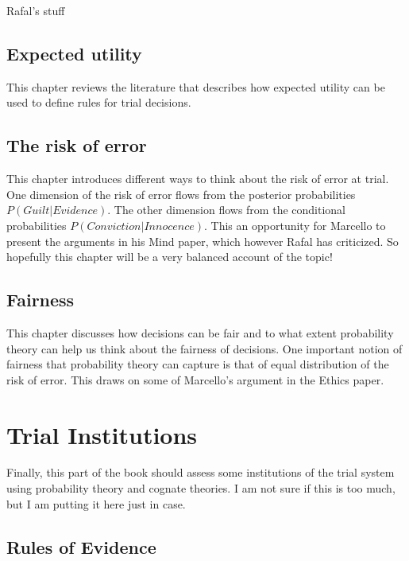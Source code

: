 \documentclass[]{book}
\begin{document}
Rafal's stuff

\chapter{Expected utility}

This chapter reviews the literature that describes how expected utility
can be used to define rules for trial decisions.

\chapter{The risk of error}

This chapter introduces different ways to think about the risk of error
at trial. One dimension of the risk of error flows from the posterior
probabilities \(P(Guilt | Evidence)\). The other dimension flows from
the conditional probabilities \(P(Conviction | Innocence)\). This an
opportunity for Marcello to present the arguments in his Mind paper,
which however Rafal has criticized. So hopefully this chapter will be a
very balanced account of the topic!

\chapter{Fairness}

This chapter discusses how decisions can be fair and to what extent
probability theory can help us think about the fairness of decisions.
One important notion of fairness that probability theory can capture is
that of equal distribution of the risk of error. This draws on some of
Marcello's argument in the Ethics paper.


\part{Trial Institutions}

Finally, this part of the book should assess some institutions of the
trial system using probability theory and cognate theories. I am not
sure if this is too much, but I am putting it here just in case.


\chapter{Rules of Evidence}
\end{document}
